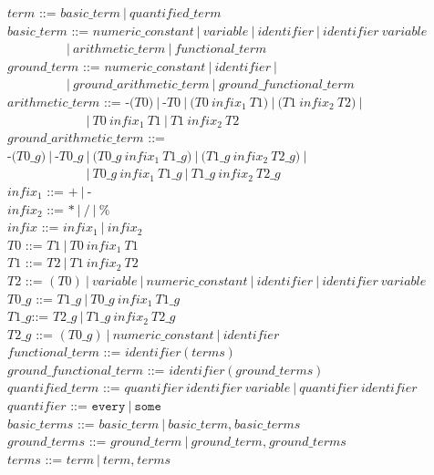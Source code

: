 \documentclass[a4paper,10pt]{article}
\providecommand{\DIFaddtex}[1]{{\protect\color{blue}\uwave{#1}}} %
\providecommand{\DIFdeltex}[1]{{\protect\color{red}\sout{#1}}}                      %
\providecommand{\DIFaddbegin}{} %
\providecommand{\DIFaddend}{} %
\providecommand{\DIFdelbegin}{} %
\providecommand{\DIFdelend}{} %
\providecommand{\DIFadd}[1]{\texorpdfstring{\DIFaddtex{#1}}{#1}} %
\providecommand{\DIFdel}[1]{\texorpdfstring{\DIFdeltex{#1}}{}} %
\begin{document}
$term$ ::= $basic\_term~|~quantified\_term$ \\ 
$basic\_term$ ::= $numeric\_constant~|~variable~|~identifier~|~identifier~variable$ \\
$~~~~~~~~~~~~~~~~~~~~~|~arithmetic\_term~|~functional\_term$\\
$ground\_term$ ::= $numeric\_constant~|~identifier~|~$ \\
$~~~~~~~~~~~~~~~~~~~~~|~ground\_arithmetic\_term~|~ground\_functional\_term$\\
$arithmetic\_term$ ::= $\texttt{-(}T0\texttt{)}~|~\texttt{-} T0 ~|~\texttt{(}T0~infix_1~T1\texttt{)}~|~\texttt{(}T1~infix_2~T2\texttt{)}~|~$ \\ $~~~~~~~~~~~~~~~~~~~~~~~~~~~~|~T0~infix_1~T1~|~T1~infix_2~T2$\\
$ground\_arithmetic\_term$ ::= $\texttt{-(}T0\_g\texttt{)}~|~\texttt{-}T0\_g~|~
\texttt{(}T0\_g~infix_1~T1\_g\texttt{)}~|~\texttt{(}T1\_g~infix_2~T2\_g\texttt{)}~|~$ \\ $~~~~~~~~~~~~~~~~~~~~~~~~~~~~|~T0\_g~infix_1~T1\_g~|~T1\_g~infix_2~T2\_g$\\


\noindent
$infix_1$ ::= $ \texttt{+} ~|~ \texttt{-} $\\
$infix_2$ ::= $ \texttt{*} ~|~ \texttt{/}~|~\texttt{\%} $\\
$infix$ ::= $infix_1~|~infix_2$\\
$T0$ ::= $T1~|~T0~infix_1~T1$\\
$T1$ ::= $T2~|~T1~infix_2~T2$ \\
$T2$ ::= $(T0)~|~variable~|~numeric\_constant~|~identifier~|~identifier~variable$ \\

\noindent
$T0\_g$ ::= $T1\_g~|~T0\_g~infix_1~T1\_g$\\
$T1\_g$::= $T2\_g~|~T1\_g~infix_2~T2\_g$ \\
$T2\_g$ ::= $(T0\_g)~|~numeric\_constant~|~identifier$ \\

\noindent
$functional\_term$ ::= $identifier~\texttt{(}~terms~\texttt{)}~$\\
$ground\_functional\_term$ ::= $identifier~\texttt{(}~ground\_terms~\texttt{)}~$\\

\noindent
$quantified\_term$ ::= \DIFdelbegin \DIFdel{$quantifier~identifier~variable~|~quantifier~identifier$}\DIFdelend \DIFaddbegin \DIFadd{$quantifier~identifier$}\DIFaddend \\
$quantifier$ ::= $\texttt{every}~|~\texttt{some}$ \\
$basic\_terms$ ::= $basic\_term~|~basic\_term\texttt{,} ~basic\_terms$ \\
$ground\_terms$ ::= $ground\_term~|~ground\_term\texttt{,} ~ground\_terms$ \\
$terms$ ::= $term~|~term\texttt{,}~ terms$ \\
\end{document}
